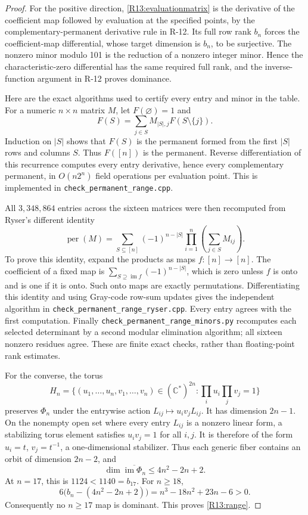 \documentclass[11pt,a4paper]{article}
\theoremstyle{definition}\newtheorem{definition}{Definition}
\begin{document}
\begin{proof}
For the positive direction, \eqref{R13:evaluationmatrix} is the
derivative of the coefficient map followed by evaluation at the
specified points, by the complementary-permanent derivative
rule in R-12. Its full row rank $b_n$ forces the coefficient-map
differential, whose target dimension is $b_n$, to be surjective.
The nonzero minor modulo 101 is the reduction of a nonzero
integer minor. Hence the characteristic-zero differential has
the same required full rank, and the inverse-function argument
in R-12 proves dominance.

Here are the exact algorithms used to certify every entry and
minor in the table. For a numeric $n\times n$ matrix $M$, let
$F(\varnothing)=1$ and
\[
 F(S)=\sum_{j\in S}M_{|S|,j}F(S\setminus\{j\}).
\]
Induction on $|S|$ shows that $F(S)$ is the permanent formed from
the first $|S|$ rows and columns $S$. Thus $F([n])$ is the
permanent. Reverse differentiation of this recurrence computes
every entry derivative, hence every complementary permanent,
in $O(n2^n)$ field operations per evaluation point. This is
implemented in \nolinkurl{check_permanent_range.cpp}.

All $3{,}348{,}864$ entries across the sixteen matrices were then
recomputed from Ryser's different identity
\[
 \operatorname{per}(M)=
 \sum_{S\subseteq[n]}(-1)^{n-|S|}
 \prod_{i=1}^n\left(\sum_{j\in S}M_{ij}\right).
\]
To prove this identity, expand the products as maps
$f:[n]\to[n]$. The coefficient of a fixed map is
$\sum_{S\supseteq\operatorname{im}f}(-1)^{n-|S|}$, which is zero
unless $f$ is onto and is one if it is onto. Such onto maps are
exactly permutations. Differentiating this identity and using
Gray-code row-sum updates gives the independent algorithm in
\nolinkurl{check_permanent_range_ryser.cpp}. Every entry agrees
with the first computation. Finally
\nolinkurl{check_permanent_range_minors.py} recomputes each
selected determinant by a second modular elimination algorithm;
all sixteen nonzero residues agree. These are finite exact
checks, rather than floating-point rank estimates.

For the converse, the torus
\[
 H_n=\{(u_1,\ldots,u_n,v_1,\ldots,v_n)\in(\mathbb C^*)^{2n}:
                  \prod_i u_i\prod_j v_j=1\}
\]
preserves $\Phi_n$ under the entrywise action
$L_{ij}\mapsto u_i v_jL_{ij}$. It has dimension $2n-1$.
On the nonempty open set where every entry $L_{ij}$ is a nonzero
linear form, a stabilizing torus element satisfies
$u_i v_j=1$ for all $i,j$. It is therefore of the form
$u_i=t$, $v_j=t^{-1}$, a one-dimensional stabilizer.
Thus each generic fiber contains an orbit of dimension $2n-2$,
and
\begin{equation}\label{R13:dimension}
 \dim\overline{\operatorname{im}\Phi_n}
       \leq4n^2-2n+2.
\end{equation}
At $n=17$, this is $1124<1140=b_{17}$. For $n\geq18$,
\[
 6\bigl(b_n-(4n^2-2n+2)\bigr)
 =n^3-18n^2+23n-6>0.
\]
Consequently no $n\geq17$ map is dominant. This proves
\eqref{R13:range}.


\end{proof}
\end{document}
